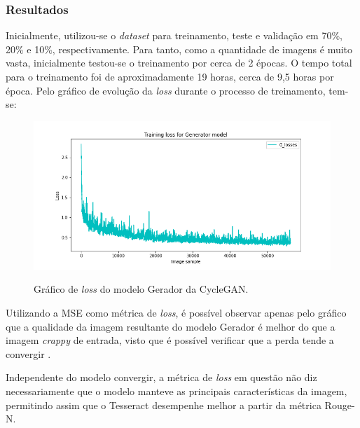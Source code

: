 \subsubsection{Resultados}

Inicialmente, utilizou-se o \textit{dataset} para treinamento, teste e validação em 70\%, 20\% e 10\%, respectivamente. Para tanto, como a quantidade de imagens é muito vasta, inicialmente testou-se o treinamento por cerca de 2 épocas. O tempo total para o treinamento foi de aproximadamente 19 horas, cerca de 9,5 horas por época. Pelo gráfico de evolução da \textit{loss} durante o processo de treinamento, tem-se:

\begin{figure}[H]
  \centering
  \caption{Gráfico de \textit{loss} do modelo Gerador da CycleGAN.}
  \includegraphics[scale=.55]{figuras/g_losses.png}
  \label{fig:g_losses}
\end{figure}

Utilizando a MSE como métrica de \textit{loss}, é possível observar apenas pelo gráfico que a qualidade da imagem resultante do modelo Gerador é melhor do que a imagem \textit{crappy} de entrada, visto que é possível verificar que a perda tende a convergir \cite{everything-about-nn}.

Independente do modelo convergir, a métrica de \textit{loss} em questão não diz necessariamente que o modelo manteve as principais características da imagem, permitindo assim que o Tesseract desempenhe melhor a partir da métrica Rouge-N.

